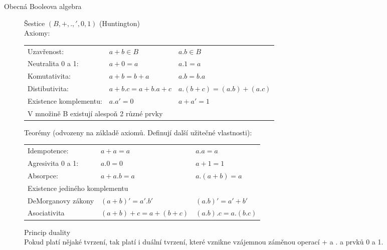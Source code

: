\documentclass[a4wide]{report}
\begin{document}
\begin{description}
	\item[Obecná Booleova algebra] Šestice $(B, +, ., ', 0, 1)$ (Huntington)\\
		Axiomy:\\
		\begin{tabular}{l l l}
			Uzavřenost: 			&$a+b \in B$		&$a.b \in B$	\\
			Neutralita 0 a 1: 		&$a+0 = a$			&$a.1 = a$		\\
			Komutativita: 			&$a+b = b+a$		&$a.b = b.a$	\\
			Distibutivita:	 		&$a+b.c = a+b.a+c$	&$a.(b+c) = (a.b)+(a.c)$\\
			Existence komplementu: 	&$a.a' = 0$			&$a+a' = 1$		\\
			\multicolumn{3}{l}{V množině B existují alespoň 2 různé prvky}
		\end{tabular}
		Teorémy (odvozeny na základě axiomů. Definují další užitečné vlastnosti):\\
		\begin{tabular}{l l l}
			Idempotence: 			&$a+a = a$			&$a.a = a$		\\
			Agresivita 0 a 1: 		&$a.0 = 0$			&$a+1 = 1$		\\
			Absorpce: 				&$a+a.b = a$		&$a.(a+b) = a$	\\
			\multicolumn{3}{l}{Existence jediného komplementu}			\\
			DeMorganovy zákony		&$(a+b)' = a'.b'$	&$(a.b)' = a'+b'$\\
			Asociativita			&$(a+b)+c = a+(b+c)$&$(a.b).c = a.(b.c)$\\
		\end{tabular}
		
		Princip duality\\
			Pokud platí nějaké tvrzení, tak platí i duální tvrzení, které vznikne vzájemnou záměnou operací + a . a prvků 0 a 1.


\end{description}
\end{document}
